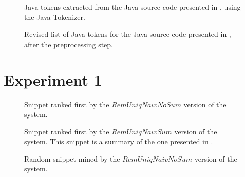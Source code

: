 \vspace{-10pt}

\begin{figure}[ht]

\vspace{-10pt}
\caption[Java tokens extracted using the Java Tokenizer]{Java tokens extracted from the Java source code presented in , using the Java Tokenizer.}
\label{listings:java-tokenizer-tokens-org}
\end{figure}

\vspace{-10pt}

\begin{figure}[H]

\vspace{-10pt}
\caption[Revised list of Java tokens]{Revised list of Java tokens for the Java source code presented in , after the preprocessing step.}
\label{listings:java-tokenizer-tokens-rev}
\end{figure}


\section{Experiment 1}
\label{sec:exp1-qualitative}

\begin{figure}[!h]

\vspace{-10pt}
\caption[Snippet ranked first by the $RemUniqNaivNoSum$ version of the system]{Snippet ranked first by the $RemUniqNaivNoSum$ version of the system.}
\label{listings:exp1-ex1-org-java}
\end{figure}

\vspace{-10pt}

\begin{figure}[!h]

\vspace{-10pt}
\caption[Snippet ranked first by the $RemUniqNaivSum$ version of the system]{Snippet ranked first by the $RemUniqNaivSum$ version of the system. This snippet is a summary of the one presented in .}
\label{listings:exp1-ex1-sum-java}
\end{figure}


\begin{figure}[!h]

\vspace{-10pt}
\caption[Random snippet mined by the $RemUniqNaivNoSum$ version of the system]{Random snippet mined by the $RemUniqNaivNoSum$ version of the system.}
\label{listings:exp1-ex2-org-java}
\end{figure}


